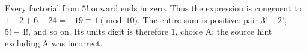 Every factorial from $5!$ onward ends in zero. Thus the expression is congruent to $1-2+6-24=-19\equiv1\pmod{10}$. The entire sum is positive: pair $3!-2!$, $5!-4!$, and so on. Its units digit is therefore $\boxed1$, choice A; the source hint excluding A was incorrect.
